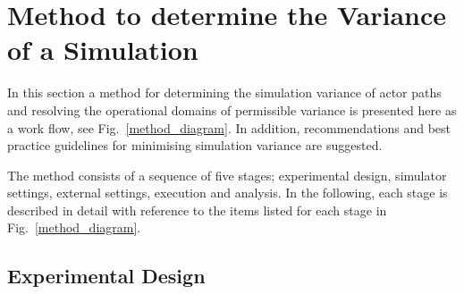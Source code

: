\documentclass[runningheads,twocolumn,a4paper,10pt]{llncs}
\begin{document}
\section{Method to determine the Variance of a Simulation} \label{s:methodology}
%
In this section a method for determining the simulation variance of actor paths and resolving the operational domains of permissible variance is presented here as a work flow, see Fig.~\ref{method_diagram}.
%
In addition, recommendations and best practice guidelines for minimising simulation variance are suggested.
%

The method consists of a sequence of five stages; experimental design, simulator settings, external settings, execution and analysis. In the following, each stage is described in detail with reference to the items listed for each stage in Fig.~\ref{method_diagram}.

\subsection{Experimental Design}\label{s:design_experiment}

\end{document}

